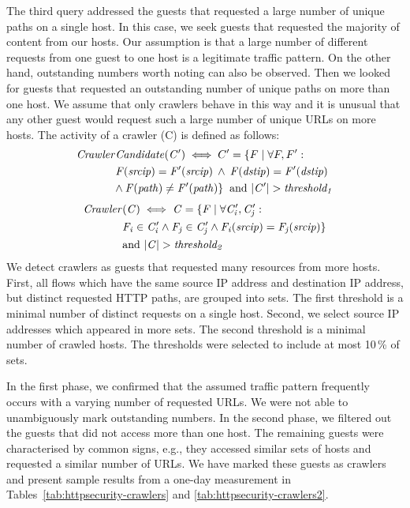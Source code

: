 The third query addressed the guests that requested a large number of unique paths on a single host. In this case, we seek guests that requested the majority of content from our hosts. Our assumption is that a large number of different requests from one guest to one host is a legitimate traffic pattern. On the other hand, outstanding numbers worth noting can also be observed. Then we looked for guests that requested an outstanding number of unique paths on more than one host. We assume that only crawlers behave in this way and it is unusual that any other guest would request such a large number of unique URLs on more hosts. The activity of a crawler (C) is defined as follows:
\begin{equation*}
\begin{split}
\mathit{Crawler}&\mathit{Candidate(C')} \iff C' = \{F \mid \forall F, F':\\
&\mathit{F(srcip) = F'(srcip) \: \land \: F(dstip) = F'(dstip)}\\
&\mathit{\land \: F(path) \neq F'(path)\} \: \mbox{ and } |C'| > threshold_1}
\end{split}
\end{equation*}
\begin{equation*}
\begin{split}
\mathit{Crawler}&\mathit{(C) \iff C = \{F \mid \forall C^\prime_i, C^\prime_j:}\\
&\mathit{F_i \in C^\prime_i \land F_j \in C^\prime_j \land F_i(srcip) = F_j(srcip)\}}\\
&\mathit{\mbox{and } |C| > threshold_2}
\end{split}
\end{equation*}
We detect crawlers as guests that requested many resources from more hosts. First, all flows which have the same source IP address and destination IP address, but distinct requested HTTP paths, are grouped into sets. The first threshold is a minimal number of distinct requests on a single host. Second, we select source IP addresses which appeared in more sets. The second threshold is a minimal number of crawled hosts. The thresholds were selected to include at most 10\,\% of sets.

In the first phase, we confirmed that the assumed traffic pattern frequently occurs with a varying number of requested URLs. We were not able to unambiguously mark outstanding numbers. In the second phase, we filtered out the guests that did not access more than one host. The remaining guests were characterised by common signs, e.g., they accessed similar sets of hosts and requested a similar number of URLs. We have marked these guests as crawlers and present sample results from a one-day measurement in Tables~\ref{tab:httpsecurity-crawlers} and \ref{tab:httpsecurity-crawlers2}.

